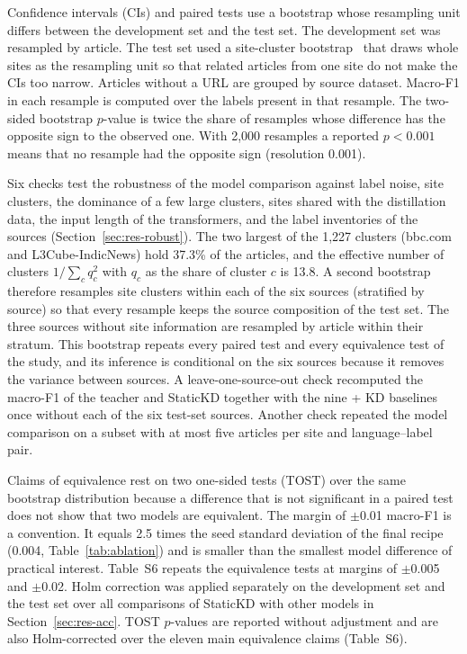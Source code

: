 \documentclass{ieeeaccess}
\begin{document}
Confidence intervals (CIs) and paired tests use a bootstrap whose resampling unit differs between the development set and the test set. The development set was resampled by article. The test set used a site-cluster bootstrap~\cite{field2007bootstrapping} that draws whole sites as the resampling unit so that related articles from one site do not make the CIs too narrow. Articles without a URL are grouped by source dataset. Macro-F1 in each resample is computed over the labels present in that resample. The two-sided bootstrap $p$-value is twice the share of resamples whose difference has the opposite sign to the observed one. With 2,000 resamples a reported $p<0.001$ means that no resample had the opposite sign (resolution 0.001).

Six checks test the robustness of the model comparison against label noise, site clusters, the dominance of a few large clusters, sites shared with the distillation data, the input length of the transformers, and the label inventories of the sources (Section~\ref{sec:res-robust}). The two largest of the 1,227 clusters (bbc.com and L3Cube-IndicNews) hold 37.3\% of the articles, and the effective number of clusters $1/\sum_c q_c^{2}$ with $q_c$ as the share of cluster $c$ is 13.8. A second bootstrap therefore resamples site clusters within each of the six sources (stratified by source) so that every resample keeps the source composition of the test set. The three sources without site information are resampled by article within their stratum. This bootstrap repeats every paired test and every equivalence test of the study, and its inference is conditional on the six sources because it removes the variance between sources. A leave-one-source-out check recomputed the macro-F1 of the teacher and StaticKD together with the nine + KD baselines once without each of the six test-set sources. Another check repeated the model comparison on a subset with at most five articles per site and language--label pair.

Claims of equivalence rest on two one-sided tests (TOST) over the same bootstrap distribution because a difference that is not significant in a paired test does not show that two models are equivalent. The margin of $\pm$0.01 macro-F1 is a convention. It equals 2.5 times the seed standard deviation of the final recipe (0.004, Table~\ref{tab:ablation}) and is smaller than the smallest model difference of practical interest. Table~S6 repeats the equivalence tests at margins of $\pm$0.005 and $\pm$0.02. Holm correction was applied separately on the development set and the test set over all comparisons of StaticKD with other models in Section~\ref{sec:res-acc}. TOST $p$-values are reported without adjustment and are also Holm-corrected over the eleven main equivalence claims (Table~S6).
\end{document}
